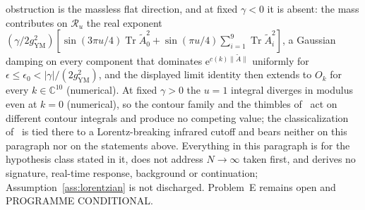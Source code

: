 obstruction is the massless flat direction, and at fixed \(\gamma<0\) it is absent: the mass contributes on \(\mathcal R_u\) the real exponent \((\gamma/2g_{\mathrm{YM}}^2)[\sin(3\pi u/4)\operatorname{Tr}\tilde A_0^2+\sin(\pi u/4)\sum_{i=1}^{9}\operatorname{Tr}\tilde A_i^2]\), a Gaussian damping on every component that dominates \(\mathrm e^{c(k)\|\tilde A\|}\) uniformly for \(\epsilon\le\epsilon_0<|\gamma|/(2g_{\mathrm{YM}}^2)\), and the displayed limit identity then extends to \(O_k\) for every \(k\in\mathbb C^{10}\) (numerical). At fixed \(\gamma>0\) the \(u=1\) integral diverges in modulus even at \(k=0\) (numerical), so the contour family and the thimbles of~\cite{ChouNishimuraTripathi2025} act on different contour integrals and produce no competing value; the classicalization of~\cite{AsanoNishimuraPiensukYamamori2025} is tied there to a Lorentz-breaking infrared cutoff and bears neither on this paragraph nor on the statements above. Everything in this paragraph is for the hypothesis class stated in it, does not address \(N\to\infty\) taken first, and derives no signature, real-time response, background or continuation; Assumption~\ref{ass:lorentzian} is not discharged. Problem~E remains open and PROGRAMME CONDITIONAL.


